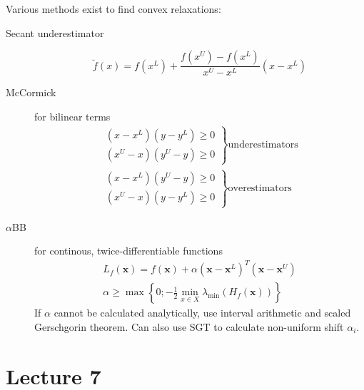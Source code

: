 \documentclass[a4paper,twocolumn,10pt]{article}
\begin{document}
Various methods exist to find convex relaxations:
\begin{description}
    \item[Secant underestimator]
        \begin{equation}
            \breve{f}(x)=f\left(x^{L}\right)+\frac{f\left(x^{U}\right)-f\left(x^{L}\right)}{x^{U}-x^{L}}\left(x-x^{L}\right)
        \end{equation}
    \item[McCormick] for bilinear terms
        \begin{gather*}
            \left.\begin{array}{l}
                (x-x^L)(y-y^L) \geq 0 \\
                (x^U-x)(y^U-y) \geq 0        
            \end{array} \right\} \text{underestimators} \\
            \left.\begin{array}{l}
                (x-x^L)(y^U-y) \geq 0 \\
                (x^U-x)(y-y^L) \geq 0
            \end{array} \right\} \text{overestimators}
        \end{gather*}
    \item[$\alpha$BB] for continous, twice-differentiable functions
        \begin{gather}
            L_{f}(\boldsymbol{x})=f(\boldsymbol{x})+\alpha\left(\boldsymbol{x}-\boldsymbol{x}^{L}\right)^{T}\left(\boldsymbol{x}-\boldsymbol{x}^{U}\right) \\
            \alpha \geq \max \left\{0 ;-\frac{1}{2} \min _{x \in X} \lambda_{\min }\left(H_{f}(\boldsymbol{x})\right)\right\}
        \end{gather}
        If $\alpha$ cannot be calculated analytically, use interval arithmetic and scaled Gerschgorin theorem. Can also use SGT to calculate non-uniform shift $\alpha_i$.
\end{description}

\section{Lecture 7}
\end{document}
